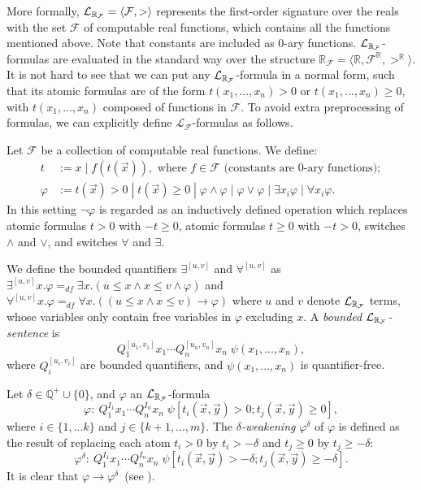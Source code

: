 \documentclass[10pt,envcountsect]{llncs}
\begin{document}
More formally, $\mathcal{L}_{\mathbb{R}_{\mathcal{F}}} = \langle \mathcal{F}, > \rangle$ represents the first-order signature over the reals with the set $\mathcal{F}$ of computable real functions, which contains all the functions mentioned above. Note that constants are included as 0-ary functions. $\mathcal{L}_{\mathbb{R}_{\mathcal{F}}}$-formulas are evaluated in the standard way over the structure $\mathbb{R}_{\mathcal{F}}= \langle \mathbb{R}, \mathcal{F}^{\mathbb{R}}, >^{\mathbb{R}}\rangle$. It is not hard to see that  we can put any $\mathcal{L}_{\mathbb{R}_{\mathcal{F}}}$-formula in a normal form, such that its atomic formulas are of the form $t(x_1,...,x_n)>0$ or $t(x_1,...,x_n)\geq 0$, with $t(x_1,...,x_n)$ composed of functions in $\mathcal{F}$. To avoid extra preprocessing of formulas, we can explicitly define $\mathcal{L}_{\mathcal{F}}$-formulas as follows.
\begin{definition}
Let $\mathcal{F}$ be a collection of computable real functions. We define:
\begin{align*}
t& := x \; | \; f(t(\vec x)), \mbox{ where }f\in \mathcal{F} \mbox{ (constants are 0-ary functions)};\\
\varphi& := t(\vec x)> 0 \; | \; t(\vec x)\geq 0 \; | \; \varphi\wedge\varphi
\; | \; \varphi\vee\varphi \; | \; \exists x_i\varphi \; |\; \forall x_i\varphi.
\end{align*}
In this setting $\neg\varphi$ is regarded as an inductively defined operation
which replaces atomic formulas $t>0$ with $-t\geq 0$, atomic formulas $t\geq 0$
with $-t>0$, switches $\wedge$ and $\vee$, and switches $\forall$ and $\exists$.
\end{definition}
\begin{definition}
We define the bounded quantifiers $\exists^{[u,v]}$ and $\forall^{[u,v]}$ as
$\exists^{[u,v]}x.\varphi =_{df}\exists x. ( u \leq x \land x \leq v \wedge
\varphi)$ and $
\forall^{[u,v]}x.\varphi =_{df} \forall x. ( (u \leq x \land x \leq v)
\rightarrow \varphi)$
where $u$ and $v$ denote $\mathcal{L}_{\mathbb{R}_{\mathcal{F}}}$ terms, whose variables only
contain free variables in $\varphi$ excluding $x$. A {\em bounded $\mathcal{L}_{\mathbb{R}_{\mathcal{F}}}$-sentence} is
$$Q_1^{[u_1,v_1]}x_1\cdots Q_n^{[u_n,v_n]}x_n\;\psi(x_1,...,x_n),$$
where $Q_i^{[u_i,v_i]}$ are bounded quantifiers, and $\psi(x_1,...,x_n)$ is
quantifier-free.
\end{definition}
\begin{definition}\label{variants}
Let $\delta\in \mathbb{Q}^+\cup\{0\}$, and $\varphi$ an
$\mathcal{L}_{\mathbb{R}_{\mathcal{F}}}$-formula
$$\varphi: \ Q_1^{I_1}x_1\cdots Q_n^{I_n}x_n\;\psi[t_i(\vec x, \vec y)>0;
t_j(\vec x, \vec
y)\geq 0],$$ where $i\in\{1,...k\}$ and $j\in\{k+1,...,m\}$. The {\em
$\delta$-weakening} $\varphi^{\delta}$ of $\varphi$ is
defined as the result of replacing each atom $t_i > 0$ by $t_i >
-\delta$ and $t_j \geq 0$ by $t_j \geq -\delta$:
$$\varphi^{\delta}:\ Q_1^{I_1}x_1\cdots Q_n^{I_n}x_n\;\psi[t_i(\vec x, \vec
y)>-\delta; t_j(\vec x,
\vec y)\geq -\delta].$$
It is clear that $\varphi\rightarrow\varphi^{\delta}$~(see \cite{DBLP:conf/lics/GaoAC12}).
\end{definition}
\end{document}
